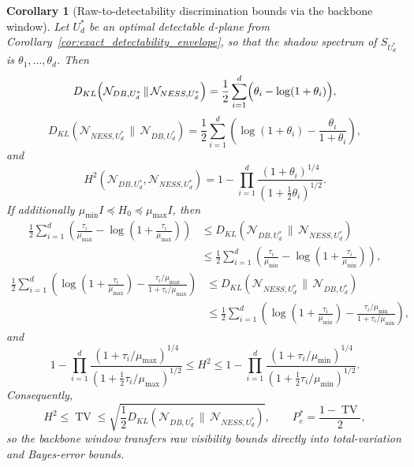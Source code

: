 \documentclass[11pt,a4paper]{article}
\numberwithin{equation}{section}
\theoremstyle{thmcompact}
\newtheorem{corollary}[theorem]{Corollary}
\theoremstyle{remark}
\begin{document}
\begin{corollary}[Raw-to-detectability discrimination bounds via the backbone window]
\label{cor:raw_to_detectability_discrimination_bounds}
Let \(U_d^\ast\) be an optimal detectable \(d\)-plane from Corollary~\ref{cor:exact_detectability_envelope}, so that the shadow spectrum of \(S_{U_d^\ast}\) is \(\theta_1,\dots,\theta_d\). Then
\begin{equation}
D_{KL}\!\left(\mathcal N_{DB,U_d^\ast}\,\|\,\mathcal N_{NESS,U_d^\ast}\right)
=
\frac12\sum_{i=1}^{d}\Bigl(\theta_i-\log(1+\theta_i)\Bigr),
\end{equation}
\begin{equation}
D_{KL}\!\left(\mathcal N_{NESS,U_d^\ast}\,\|\,\mathcal N_{DB,U_d^\ast}\right)
=
\frac12\sum_{i=1}^{d}\left(\log(1+\theta_i)-\frac{\theta_i}{1+\theta_i}\right),
\end{equation}
and
\begin{equation}
H^2\!\left(\mathcal N_{DB,U_d^\ast},\mathcal N_{NESS,U_d^\ast}\right)
=
1-\prod_{i=1}^{d}\frac{(1+\theta_i)^{1/4}}{(1+\tfrac12\theta_i)^{1/2}}.
\end{equation}
If additionally \(\mu_{\min}I\preceq H_0\preceq \mu_{\max}I\), then
\begin{equation}
\begin{aligned}
\frac12\sum_{i=1}^{d}\left(\frac{\tau_i}{\mu_{\max}}-\log\!\left(1+\frac{\tau_i}{\mu_{\max}}\right)\right)
&\le
D_{KL}\!\left(\mathcal N_{DB,U_d^\ast}\,\|\,\mathcal N_{NESS,U_d^\ast}\right) \\
&\le
\frac12\sum_{i=1}^{d}\left(\frac{\tau_i}{\mu_{\min}}-\log\!\left(1+\frac{\tau_i}{\mu_{\min}}\right)\right),
\end{aligned}
\end{equation}
\begin{equation}
\begin{aligned}
\frac12\sum_{i=1}^{d}\left(\log\!\left(1+\frac{\tau_i}{\mu_{\max}}\right)-\frac{\tau_i/\mu_{\max}}{1+\tau_i/\mu_{\max}}\right)
&\le
D_{KL}\!\left(\mathcal N_{NESS,U_d^\ast}\,\|\,\mathcal N_{DB,U_d^\ast}\right) \\
&\le
\frac12\sum_{i=1}^{d}\left(\log\!\left(1+\frac{\tau_i}{\mu_{\min}}\right)-\frac{\tau_i/\mu_{\min}}{1+\tau_i/\mu_{\min}}\right),
\end{aligned}
\end{equation}
and
\begin{equation}
1-\prod_{i=1}^{d}\frac{(1+\tau_i/\mu_{\max})^{1/4}}{(1+\tfrac12\tau_i/\mu_{\max})^{1/2}}
\le
H^2
\le
1-\prod_{i=1}^{d}\frac{(1+\tau_i/\mu_{\min})^{1/4}}{(1+\tfrac12\tau_i/\mu_{\min})^{1/2}}.
\end{equation}
Consequently,
\begin{equation}
H^2\le \operatorname{TV}\le \sqrt{\frac12 D_{KL}\!\left(\mathcal N_{DB,U_d^\ast}\,\|\,\mathcal N_{NESS,U_d^\ast}\right)},
\qquad
P_e^\ast=\frac{1-\operatorname{TV}}{2},
\end{equation}
so the backbone window transfers raw visibility bounds directly into total-variation and Bayes-error bounds.
\end{corollary}
\end{document}
